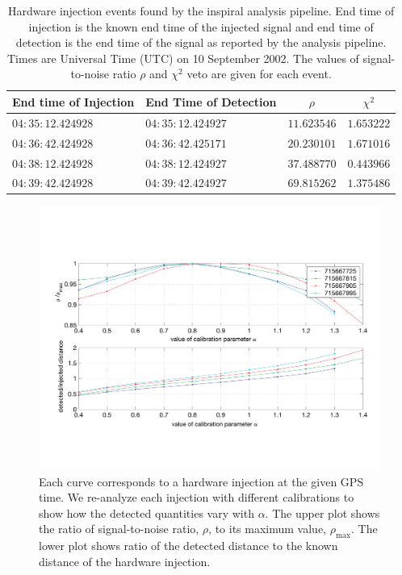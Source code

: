 \begin{table}[p]
  \begin{flushright}
  \begin{tabular}{l|l|c|c}
  End time of Injection&End Time of Detection&$\rho$&$\chi^2$\\
  \hline
  $04:35:12.424928$ & $04:35:12.424927$ & $11.623546$ & $1.653222$ \\
  $04:36:42.424928$ & $04:36:42.425171$ & $20.230101$ & $1.671016$ \\
  $04:38:12.424928$ & $04:38:12.424927$ & $37.488770$ & $0.443966$ \\
  $04:39:42.424928$ & $04:39:42.424927$ & $69.815262$ & $1.375486$ \\
  \end{tabular}
  \end{flushright}
  \caption[Hardware Injections Found by the Analysis Pipeline]{%
  Hardware injection events found by the inspiral analysis pipeline. End time
  of injection is the known end time of the injected signal and end time of
  detection is the end time of the signal as reported by the analysis
  pipeline. Times are Universal Time (UTC) on 10 September 2002. The values of
  signal-to-noise ratio $\rho$ and $\chi^2$ veto are given for each event.
  }
\label{t:triggers}
\end{table}

\begin{figure}[p]
  \vspace{5pt}
  \begin{flushright}
    \includegraphics[width=\textwidth]{figures/hardware/calibration}    
  \end{flushright}
  \caption[Study of Calibration Using Hardware Injections]{%
  Each curve corresponds to a hardware injection at the given GPS time. We
  re-analyze each injection with different calibrations to show how the
  detected quantities vary with $\alpha$. The upper plot shows the ratio of
  signal-to-noise ratio, $\rho$, to its maximum value, $\rho_{\mathrm{max}}$.
  The lower plot shows ratio of the detected distance to the known distance of
  the hardware injection.
  }
\label{f:calibration}
\end{figure}

